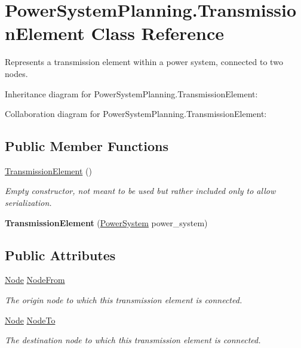 \hypertarget{class_power_system_planning_1_1_transmission_element}{}\section{Power\+System\+Planning.\+Transmission\+Element Class Reference}
\label{class_power_system_planning_1_1_transmission_element}


Represents a transmission element within a power system, connected to two nodes.  




Inheritance diagram for Power\+System\+Planning.\+Transmission\+Element\+:


Collaboration diagram for Power\+System\+Planning.\+Transmission\+Element\+:
\subsection*{Public Member Functions}
\begin{DoxyCompactItemize}
\item 
\hyperlink{class_power_system_planning_1_1_transmission_element_a059192948c609c1d264863b16159cfb9}{Transmission\+Element} ()
\begin{DoxyCompactList}\small\item\em Empty constructor, not meant to be used but rather included only to allow serialization. \end{DoxyCompactList}\item 
{\bfseries Transmission\+Element} (\hyperlink{class_power_system_planning_1_1_power_system}{Power\+System} power\+\_\+system)\hypertarget{class_power_system_planning_1_1_transmission_element_a5203d1bc00317c0e399ae07e3ef3e850}{}\label{class_power_system_planning_1_1_transmission_element_a5203d1bc00317c0e399ae07e3ef3e850}

\end{DoxyCompactItemize}
\subsection*{Public Attributes}
\begin{DoxyCompactItemize}
\item 
\hyperlink{class_power_system_planning_1_1_node}{Node} \hyperlink{class_power_system_planning_1_1_transmission_element_a361691d8c6720d32ab4e2be4e77233b3}{Node\+From}
\begin{DoxyCompactList}\small\item\em The origin node to which this transmission element is connected. \end{DoxyCompactList}\item 
\hyperlink{class_power_system_planning_1_1_node}{Node} \hyperlink{class_power_system_planning_1_1_transmission_element_adfffaeb9dab17f7f2bafec0f319b2fe5}{Node\+To}
\begin{DoxyCompactList}\small\item\em The destination node to which this transmission element is connected. \end{DoxyCompactList}\end{DoxyCompactItemize}

